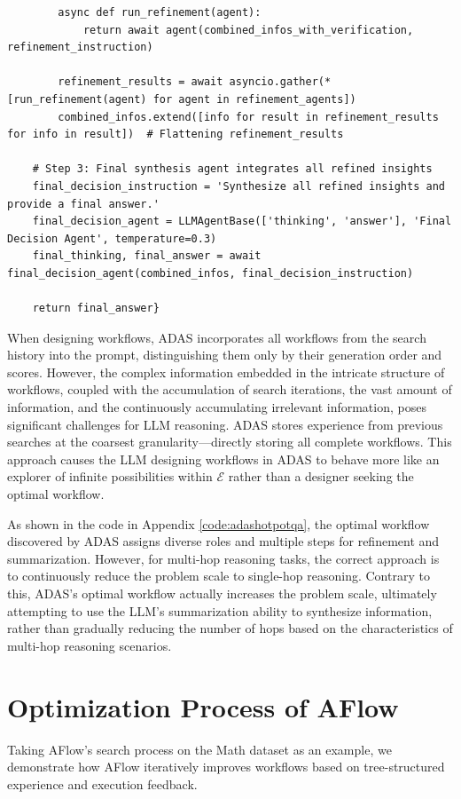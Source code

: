 \documentclass{article} %
\newcommand{\model}{{\sc AFlow}\xspace}
\theoremstyle{plain}
\theoremstyle{definition}
\theoremstyle{remark}
\begin{document}
\begin{tcolorbox}
\begin{verbatim}
        async def run_refinement(agent):
            return await agent(combined_infos_with_verification, refinement_instruction)
        
        refinement_results = await asyncio.gather(*[run_refinement(agent) for agent in refinement_agents])
        combined_infos.extend([info for result in refinement_results for info in result])  # Flattening refinement_results

    # Step 3: Final synthesis agent integrates all refined insights
    final_decision_instruction = 'Synthesize all refined insights and provide a final answer.'
    final_decision_agent = LLMAgentBase(['thinking', 'answer'], 'Final Decision Agent', temperature=0.3)
    final_thinking, final_answer = await final_decision_agent(combined_infos, final_decision_instruction)

    return final_answer}
\end{verbatim}
\end{tcolorbox}
\label{code:adashotpotqa}


When designing workflows, ADAS incorporates all workflows from the search history into the prompt, distinguishing them only by their generation order and scores. However, the complex information embedded in the intricate structure of workflows, coupled with the accumulation of search iterations, the vast amount of information, and the continuously accumulating irrelevant information, poses significant challenges for LLM reasoning. ADAS stores experience from previous searches at the coarsest granularity—directly storing all complete workflows. This approach causes the LLM designing workflows in ADAS to behave more like an explorer of infinite possibilities within $\mathcal{E}$ rather than a designer seeking the optimal workflow.


As shown in the code in Appendix \ref{code:adashotpotqa}, the optimal workflow discovered by ADAS assigns diverse roles and multiple steps for refinement and summarization. However, for multi-hop reasoning tasks, the correct approach is to continuously reduce the problem scale to single-hop reasoning. Contrary to this, ADAS's optimal workflow actually increases the problem scale, ultimately attempting to use the LLM's summarization ability to synthesize information, rather than gradually reducing the number of hops based on the characteristics of multi-hop reasoning scenarios. 

\section{Optimization Process of AFlow}
Taking \model's search process on the Math dataset as an example, we demonstrate how \model iteratively improves workflows based on tree-structured experience and execution feedback.
\label{sec:trajectory}
\end{document}
